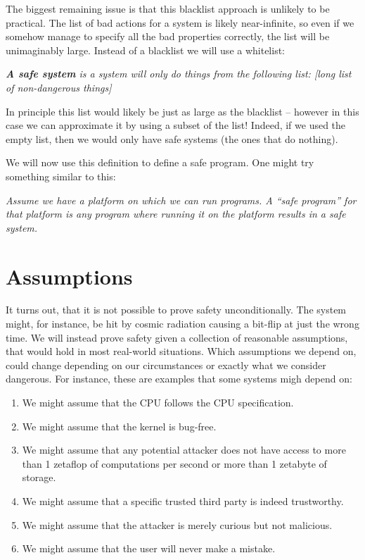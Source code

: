 The biggest remaining issue is that this blacklist approach is unlikely to be
practical. The list of bad actions for a system is likely near-infinite, so even
if we somehow manage to specify all the bad properties correctly, the list will
be unimaginably large. Instead of a blacklist we will use a whitelist:

\vspace{0.3cm}
\begin{addmargin}{1cm}
  {\it \textbf{A safe system} is a system will only do things from the following
    list: [long list of non-dangerous things]}
\end{addmargin}
\vspace{0.3cm}

In principle this list would likely be just as large as the blacklist -- however
in this case we can approximate it by using a subset of the list! Indeed, if we
used the empty list, then we would only have safe systems (the ones that do
nothing).

We will now use this definition to define a safe program. One might try
something similar to this:

\vspace{0.3cm}
\begin{addmargin}{1cm}
  {\it Assume we have a platform on which we can run programs. A ``safe
    program'' for that platform is any program where running it on the platform
    results in a safe system.}
\end{addmargin}
\vspace{0.3cm}

\section{Assumptions}
It turns out, that it is not possible to prove safety unconditionally. The
system might, for instance, be hit by cosmic radiation causing a bit-flip at
just the wrong time. We will instead prove safety given a collection of
reasonable assumptions, that would hold in most real-world situations. Which
assumptions we depend on, could change depending on our circumstances or exactly
what we consider dangerous. For instance, these are examples that some systems
migh depend on:

\begin{enumerate}
\item We might assume that the CPU follows the CPU specification.
\item We might assume that the kernel is bug-free.
\item We might assume that any potential attacker does not have access to more
  than 1 zetaflop of computations per second or more than 1 zetabyte of storage.
\item We might assume that a specific trusted third party is indeed trustworthy.
\item We might assume that the attacker is merely curious but not malicious.
\item We might assume that the user will never make a mistake.
\end{enumerate}

